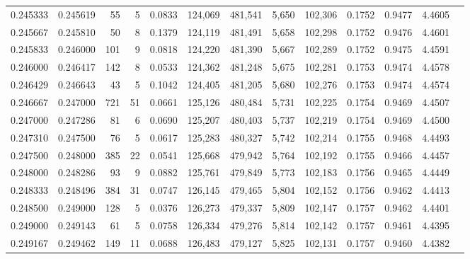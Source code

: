 \begin{tabular}{rrrrrrrrrrrrr}
0.245333 & 0.245619 &    55 &   5 &                                     0.0833 & 124,069 & 481,541 &   5,650 & 102,306 & 0.1752 & 0.9477 & 4.4605 \\
0.245667 & 0.245810 &    50 &   8 &                                     0.1379 & 124,119 & 481,491 &   5,658 & 102,298 & 0.1752 & 0.9476 & 4.4601 \\
0.245833 & 0.246000 &   101 &   9 &                                     0.0818 & 124,220 & 481,390 &   5,667 & 102,289 & 0.1752 & 0.9475 & 4.4591 \\
0.246000 & 0.246417 &   142 &   8 &                                     0.0533 & 124,362 & 481,248 &   5,675 & 102,281 & 0.1753 & 0.9474 & 4.4578 \\
0.246429 & 0.246643 &    43 &   5 &                                     0.1042 & 124,405 & 481,205 &   5,680 & 102,276 & 0.1753 & 0.9474 & 4.4574 \\
0.246667 & 0.247000 &   721 &  51 &                                     0.0661 & 125,126 & 480,484 &   5,731 & 102,225 & 0.1754 & 0.9469 & 4.4507 \\
0.247000 & 0.247286 &    81 &   6 &                                     0.0690 & 125,207 & 480,403 &   5,737 & 102,219 & 0.1754 & 0.9469 & 4.4500 \\
0.247310 & 0.247500 &    76 &   5 &                                     0.0617 & 125,283 & 480,327 &   5,742 & 102,214 & 0.1755 & 0.9468 & 4.4493 \\
0.247500 & 0.248000 &   385 &  22 &                                     0.0541 & 125,668 & 479,942 &   5,764 & 102,192 & 0.1755 & 0.9466 & 4.4457 \\
0.248000 & 0.248286 &    93 &   9 &                                     0.0882 & 125,761 & 479,849 &   5,773 & 102,183 & 0.1756 & 0.9465 & 4.4449 \\
0.248333 & 0.248496 &   384 &  31 &                                     0.0747 & 126,145 & 479,465 &   5,804 & 102,152 & 0.1756 & 0.9462 & 4.4413 \\
0.248500 & 0.249000 &   128 &   5 &                                     0.0376 & 126,273 & 479,337 &   5,809 & 102,147 & 0.1757 & 0.9462 & 4.4401 \\
0.249000 & 0.249143 &    61 &   5 &                                     0.0758 & 126,334 & 479,276 &   5,814 & 102,142 & 0.1757 & 0.9461 & 4.4395 \\
0.249167 & 0.249462 &   149 &  11 &                                     0.0688 & 126,483 & 479,127 &   5,825 & 102,131 & 0.1757 & 0.9460 & 4.4382 \\

\end{tabular}
